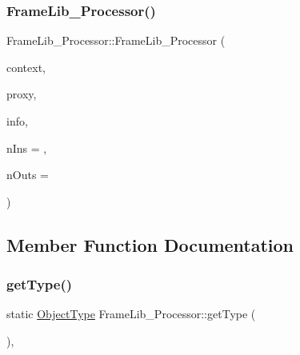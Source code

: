 \subsubsection{\texorpdfstring{Frame\+Lib\+\_\+\+Processor()}{FrameLib\_Processor()}}
{\footnotesize\ttfamily Frame\+Lib\+\_\+\+Processor\+::\+Frame\+Lib\+\_\+\+Processor (\begin{DoxyParamCaption}\item[{\hyperlink{class_frame_lib___context}{Frame\+Lib\+\_\+\+Context}}]{context,  }\item[{\hyperlink{struct_frame_lib___proxy}{Frame\+Lib\+\_\+\+Proxy} $\ast$}]{proxy,  }\item[{\hyperlink{class_frame_lib___parameters_1_1_info}{Frame\+Lib\+\_\+\+Parameters\+::\+Info} $\ast$}]{info,  }\item[{unsigned long}]{n\+Ins = {},  }\item[{unsigned long}]{n\+Outs = {} }\end{DoxyParamCaption})\hspace{0.3cm}{\ttfamily [inline]}}



\subsection{Member Function Documentation}
\mbox{\label{class_frame_lib___processor_a9cf7b310f4d1ca8843b201d692fcf544}} 
\subsubsection{\texorpdfstring{get\+Type()}{getType()}}
{\footnotesize\ttfamily static \hyperlink{_frame_lib___types_8h_a842c5e2e69277690b064bf363c017980}{Object\+Type} Frame\+Lib\+\_\+\+Processor\+::get\+Type (\begin{DoxyParamCaption}{ }\end{DoxyParamCaption})\hspace{0.3cm}{\ttfamily [inline]}, {\ttfamily [static]}}

\mbox{\label{class_frame_lib___processor_a77869c3007f363ce914d9e0073953660}} 
